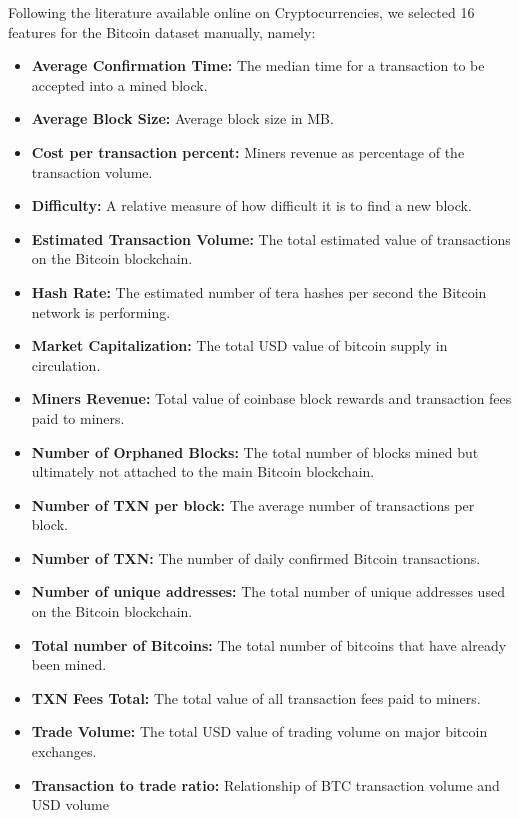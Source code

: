 \documentclass{article}
\begin{document}
Following the literature available online on Cryptocurrencies, we selected 16 features for the Bitcoin dataset manually, namely:
\begin{itemize}
\item \textbf{Average Confirmation Time:} The median time for a transaction to be accepted into a mined block.
\item \textbf{Average Block Size:} Average block size in MB.
\item \textbf{Cost per transaction percent:} Miners revenue as percentage of the transaction volume.
\item \textbf{Difficulty:} A relative measure of how difficult it is to find a new block.
\item \textbf{Estimated Transaction Volume:} The total estimated value of transactions on the Bitcoin blockchain.
\item \textbf{Hash Rate:} The estimated number of tera hashes per second the Bitcoin network is performing.
\item \textbf{Market Capitalization:} The total USD value of bitcoin supply in circulation.
\item \textbf{Miners Revenue:} Total value of coinbase block rewards and transaction fees paid to miners.
\item \textbf{Number of Orphaned Blocks:} The total number of blocks mined but ultimately not attached to the main Bitcoin blockchain.
\item \textbf{Number of TXN per block:} The average number of transactions per block.
\item \textbf{Number of TXN:} The number of daily confirmed Bitcoin transactions.
\item \textbf{Number of unique addresses:} The total number of unique addresses used on the Bitcoin blockchain.
\item \textbf{Total number of Bitcoins:} The total number of bitcoins that have already been mined.
\item \textbf{TXN Fees Total:} The total value of all transaction fees paid to miners.
\item \textbf{Trade Volume:} The total USD value of trading volume on major bitcoin exchanges.
\item \textbf{Transaction to trade ratio:} Relationship of BTC transaction volume and USD volume
\end{itemize}
\end{document}
